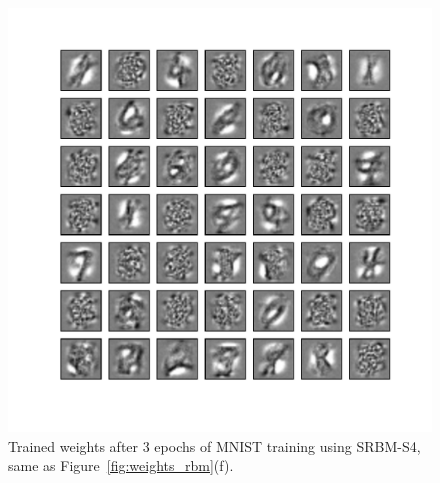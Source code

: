 \begin{figure}
	\centering
	\includegraphics[width=\textwidth]{pics_sdlm/53_MNIST_SRBM_all/2_60000_0.pdf}
	\caption[Trained weights of SRBM-S4, same as Figure~\ref{fig:weights_rbm}(f).]{Trained weights after 3 epochs of MNIST training using SRBM-S4, same as Figure~\ref{fig:weights_rbm}(f).}
	\label{fig:weights_rbm6}
\end{figure}



